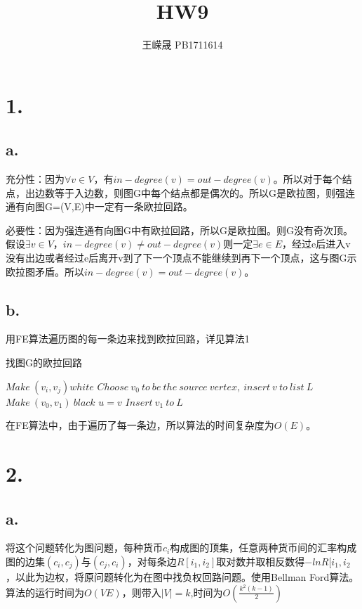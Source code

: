 \documentclass{article}
\title{HW9}
\author{王嵘晟 \quad PB1711614}
\date{}
\begin{document}
	\maketitle
	\section*{1.}
	\subsection*{a.}
	\par{充分性：因为$\forall v\in V$，有$in-degree(v)=out-degree(v)$。所以对于每个结点，出边数等于入边数，则图G中每个结点都是偶次的。所以G是欧拉图，则强连通有向图G=(V,E)中一定有一条欧拉回路。}
	\par{必要性：因为强连通有向图G中有欧拉回路，所以G是欧拉图。则G没有奇次顶。假设$\exists v\in V $，$ in-degree(v)\neq out-degree(v)$则一定$\exists e\in E$，经过e后进入v没有出边或者经过e后离开v到了下一个顶点不能继续到再下一个顶点，这与图G示欧拉图矛盾。所以$in-degree(v)=out-degree(v)$。}
	\subsection*{b.}
	\par{用FE算法遍历图的每一条边来找到欧拉回路，详见算法1}
	\begin{algorithm} 
		\caption*{找图G的欧拉回路}
		\begin{algorithmic}[1] 
				\State $Make\ (v_{i},v_{j}) white$
			\EndFor
			\State $Choose\ v_{0}\ to\ be\ the\ source\ vertex,\ insert\ v\ to\ list\ L$
				\State $Make\ (v_{0},v_{1})\ black$
				\State $u=v$
				\State $Insert\ v_{1}\ to\ L$
			\EndWhile
			\EndFunction
		\end{algorithmic}  
	\end{algorithm}
	\par{在FE算法中，由于遍历了每一条边，所以算法的时间复杂度为$O(E)$。}
	\section*{2.}
	\subsection*{a.}
	\par{将这个问题转化为图问题，每种货币$c_{i}$构成图的顶集，任意两种货币间的汇率构成图的边集$(c_{i},c_{j})$与$(c_{j},c_{i})$，对每条边$R[i_{1},i_{2}]$取对数并取相反数得$-lnR[i_{1},i_{2}$，以此为边权，将原问题转化为在图中找负权回路问题。使用Bellman Ford算法。算法的运行时间为$O(VE)$，则带入$|V|=k$,时间为$O(\frac{k^{2}(k-1)}{2})$}
\end{document}
